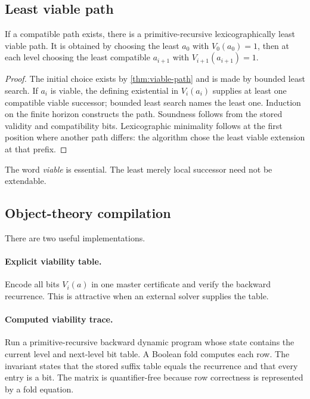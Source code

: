 \subsection{Least viable path}

\begin{theorem}
If a compatible path exists, there is a primitive-recursive lexicographically least viable path.  It is obtained by choosing the least \(a_0\) with \(V_0(a_0)=1\), then at each level choosing the least compatible \(a_{i+1}\) with \(V_{i+1}(a_{i+1})=1\).
\end{theorem}
\begin{proof}
The initial choice exists by \cref{thm:viable-path} and is made by bounded least search.  If \(a_i\) is viable, the defining existential in \(V_i(a_i)\) supplies at least one compatible viable successor; bounded least search names the least one.  Induction on the finite horizon constructs the path.  Soundness follows from the stored validity and compatibility bits.  Lexicographic minimality follows at the first position where another path differs: the algorithm chose the least viable extension at that prefix.
\end{proof}

The word \emph{viable} is essential.  The least merely local successor need not be extendable.

\subsection{Object-theory compilation}

There are two useful implementations.

\paragraph{Explicit viability table.}
Encode all bits \(V_i(a)\) in one master certificate and verify the backward recurrence.  This is attractive when an external solver supplies the table.

\paragraph{Computed viability trace.}
Run a primitive-recursive backward dynamic program whose state contains the current level and next-level bit table.  A Boolean fold computes each row.  The invariant states that the stored suffix table equals the recurrence and that every entry is a bit.  The matrix is quantifier-free because row correctness is represented by a fold equation.

